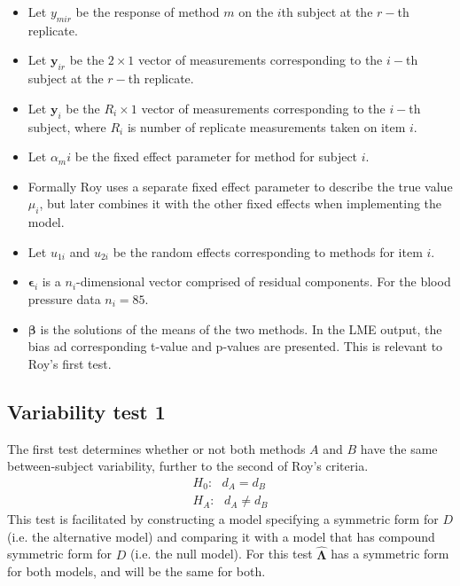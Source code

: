 \documentclass[12pt, a4paper]{report}
\theoremstyle{plain}
\theoremstyle{definition}
\theoremstyle{remark}
\begin{document}
\newpage
\begin{itemize}
	\item Let $y_{mir}$ be the response of method $m$ on the $i$th subject
	at the $r-$th replicate.
	\item Let $\boldsymbol{y}_{ir}$ be the $2 \times 1$ vector of measurements
	corresponding to the $i-$th subject at the $r-$th replicate.
	\item Let $\boldsymbol{y}_{i}$ be the $R_i \times 1$ vector of
	measurements corresponding to the $i-$th subject, where $R_i$ is number of replicate measurements taken on item $i$.
	\item Let $\alpha_mi$ be the fixed effect parameter for method for subject $i$.
	\item Formally Roy uses a separate fixed effect parameter to describe the true value $\mu_i$, but later combines it with the other fixed effects when implementing the model.
	\item Let $u_{1i}$ and $u_{2i}$ be the random effects corresponding to methods for item $i$.
	
	\item $\boldsymbol{\epsilon}_{i}$ is a $n_{i}$-dimensional vector
	comprised of residual components. For the blood pressure data $n_{i} = 85$.
	
	\item $\boldsymbol{\beta}$ is the solutions of the means of the two methods. In the LME output, the bias ad corresponding
	t-value and p-values are presented. This is relevant to Roy's first test.\end{itemize}

\newpage


\subsection{Variability test 1}
The first test determines whether or not both methods $A$ and $B$ have the same between-subject variability, further to the second of Roy's criteria.
\begin{eqnarray*}
	H_{0}: \mbox{ }d_{A}  = d_{B} \\
	H_{A}: \mbox{ }d_{A}  \neq d_{B}
\end{eqnarray*}
This test is facilitated by constructing a model specifying a symmetric form for $D$ (i.e. the alternative model) and comparing it with a model that has compound symmetric form for $D$ (i.e. the null model). For this test $\boldsymbol{\hat{\Lambda}}$ has a symmetric form for both models, and will be the same for both.
\end{document}
